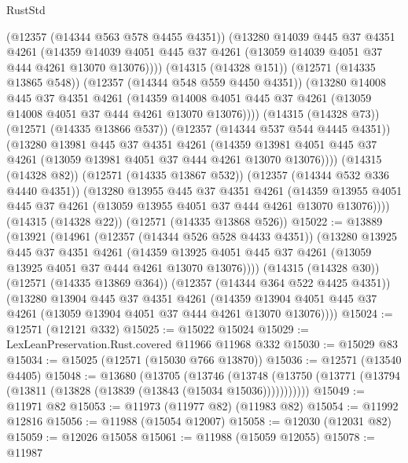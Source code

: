 \begin{lexlean}{RustStd}
\begin{coremodule}
            (@12357 (@14344 @563 @578 @4455 @4351))
            (@13280
              @14039
              @445
              @37
              @4351
              @4261
              (@14359
                @14039
                @4051
                @445
                @37
                @4261
                (@13059 @14039 @4051 @37 @444 @4261 @13070 @13076))))
          (@14315 (@14328 @151))
          (@12571 (@14335 @13865 @548))
          (@12357 (@14344 @548 @559 @4450 @4351))
          (@13280
            @14008
            @445
            @37
            @4351
            @4261
            (@14359
              @14008
              @4051
              @445
              @37
              @4261
              (@13059 @14008 @4051 @37 @444 @4261 @13070 @13076))))
        (@14315 (@14328 @73))
        (@12571 (@14335 @13866 @537))
        (@12357 (@14344 @537 @544 @4445 @4351))
        (@13280
          @13981
          @445
          @37
          @4351
          @4261
          (@14359 @13981 @4051 @445 @37 @4261 (@13059 @13981 @4051 @37 @444 @4261 @13070 @13076))))
      (@14315 (@14328 @82))
      (@12571 (@14335 @13867 @532))
      (@12357 (@14344 @532 @336 @4440 @4351))
      (@13280
        @13955
        @445
        @37
        @4351
        @4261
        (@14359 @13955 @4051 @445 @37 @4261 (@13059 @13955 @4051 @37 @444 @4261 @13070 @13076))))
    (@14315 (@14328 @22))
    (@12571 (@14335 @13868 @526))
@15022 := @13889
    (@13921
      (@14961
        (@12357 (@14344 @526 @528 @4433 @4351))
        (@13280
          @13925
          @445
          @37
          @4351
          @4261
          (@14359 @13925 @4051 @445 @37 @4261 (@13059 @13925 @4051 @37 @444 @4261 @13070 @13076))))
      (@14315 (@14328 @30))
      (@12571 (@14335 @13869 @364))
      (@12357 (@14344 @364 @522 @4425 @4351))
      (@13280
        @13904
        @445
        @37
        @4351
        @4261
        (@14359 @13904 @4051 @445 @37 @4261 (@13059 @13904 @4051 @37 @444 @4261 @13070 @13076))))
@15024 := @12571 (@12121 @332)
@15025 := @15022 @15024
@15029 := LexLeanPreservation.Rust.covered @11966 @11968 @332
@15030 := @15029 @83
@15034 := @15025 (@12571 (@15030 @766 @13870))
@15036 := @12571 (@13540 @4405)
@15048 := @13680
    (@13705
      (@13746
        (@13748 (@13750 (@13771 (@13794 (@13811 (@13828 (@13839 (@13843 (@15034 @15036)))))))))))
@15049 := @11971 @82
@15053 := @11973 (@11977 @82) (@11983 @82)
@15054 := @11992 @12816
@15056 := @11988 (@15054 @12007)
@15058 := @12030 (@12031 @82)
@15059 := @12026 @15058
@15061 := @11988 (@15059 @12055)
@15078 := @11987

\end{coremodule}
\end{lexlean}
